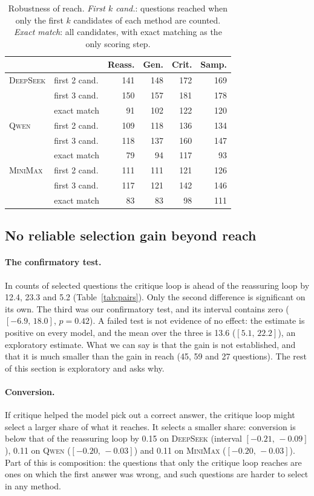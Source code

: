 \documentclass[11pt]{article}
\newcommand{\ds}{\textsc{DeepSeek}}
\newcommand{\qw}{\textsc{Qwen}}
\newcommand{\mm}{\textsc{MiniMax}}
\newcommand{\ci}[2]{$[#1,\,#2]$}
\begin{document}
\begin{table}[t]
\centering
\small
\setlength{\tabcolsep}{4pt}
\begin{tabular}{@{}ll rrrr@{}}
\toprule
 & & Reass. & Gen. & Crit. & Samp. \\
\midrule
\ds & first 2 cand. & 141 & 148 & 172 & 169 \\
 & first 3 cand. & 150 & 157 & 181 & 178 \\
 & exact match & 91 & 102 & 122 & 120 \\
\qw & first 2 cand. & 109 & 118 & 136 & 134 \\
 & first 3 cand. & 118 & 137 & 160 & 147 \\
 & exact match & 79 & 94 & 117 & 93 \\
\mm & first 2 cand. & 111 & 111 & 121 & 126 \\
 & first 3 cand. & 117 & 121 & 142 & 146 \\
 & exact match & 83 & 83 & 98 & 111 \\
\bottomrule
\end{tabular}
\caption{Robustness of reach. \emph{First $k$ cand.}: questions reached when only the first $k$ candidates of each method are counted. \emph{Exact match}: all candidates, with exact matching as the only scoring step.}
\label{tab:robust}
\end{table}

\subsection{No reliable selection gain beyond reach}
\label{sec:select}

\paragraph{The confirmatory test.}
In counts of selected questions the critique loop is ahead of the reassuring loop by 12.4, 23.3 and 5.2 (Table~\ref{tab:pairs}).
Only the second difference is significant on its own.
The third was our confirmatory test, and its interval contains zero (\ci{-6.9}{18.0}, $p=0.42$).
A failed test is not evidence of no effect: the estimate is positive on every model, and the mean over the three is 13.6 (\ci{5.1}{22.2}), an exploratory estimate.
What we can say is that the gain is not established, and that it is much smaller than the gain in reach (45, 59 and 27 questions).
The rest of this section is exploratory and asks why.

\paragraph{Conversion.}
If critique helped the model pick out a correct answer, the critique loop might select a larger share of what it reaches.
It selects a smaller share: conversion is below that of the reassuring loop by 0.15 on \ds{} (interval \ci{-0.21}{-0.09}), 0.11 on \qw{} (\ci{-0.20}{-0.03}) and 0.11 on \mm{} (\ci{-0.20}{-0.03}).
Part of this is composition: the questions that only the critique loop reaches are ones on which the first answer was wrong, and such questions are harder to select in any method.
\end{document}
